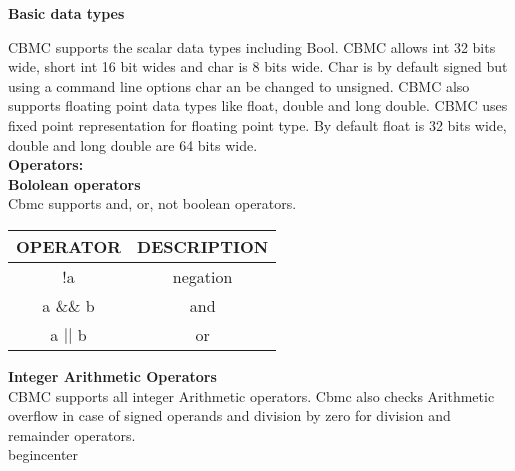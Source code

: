 \textbf{Basic data types}
 
CBMC supports the scalar data types including Bool. CBMC allows int 32 bits
wide, short int 16 bit wides and char is 8 bits wide. Char is by default 
signed but using a  command line options char an be changed  to unsigned. 
CBMC also supports floating point data types like float, double  and long double.
CBMC uses fixed point representation for floating point type.  By default float 
 is 32 bits wide, double and long double are 64 bits wide. \\
 
\textbf{ Operators:}  \\
 
\textbf{Bololean operators} \\
 
 Cbmc supports and, or,  not boolean operators. \\
 
\begin{center}

\begin{tabular}{|| c | c ||}

\hline

OPERATOR & DESCRIPTION  \\ [0.5ex]
\hline
\hline
!a & negation \\
\hline
a $ \&\& $ b & and \\
\hline
a $||$ b & or \\
\hline

\end{tabular}

\end{center}
\textbf{Integer Arithmetic Operators} \\
 
CBMC supports all integer Arithmetic operators. Cbmc also checks Arithmetic 
overflow  in case of signed operands and division by zero for division and 
remainder operators. \\
begin{center}

